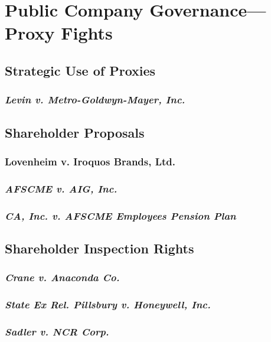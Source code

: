 \section{Public Company Governance---Proxy Fights}

\subsection{Strategic Use of Proxies}


\subsubsection{\emph{Levin v. Metro-Goldwyn-Mayer, Inc.}}


\subsection{Shareholder Proposals}

\subsubsection{Lovenheim v. Iroquos Brands, Ltd.}


\subsubsection{\emph{AFSCME v. AIG, Inc.}}


\subsubsection{\emph{CA, Inc. v. AFSCME Employees Pension Plan}}


\subsection{Shareholder Inspection Rights}


\subsubsection{\emph{Crane v. Anaconda Co.}}


\subsubsection{\emph{State Ex Rel. Pillsbury v. Honeywell, Inc.}}


\subsubsection{\emph{Sadler v. NCR Corp.}}

